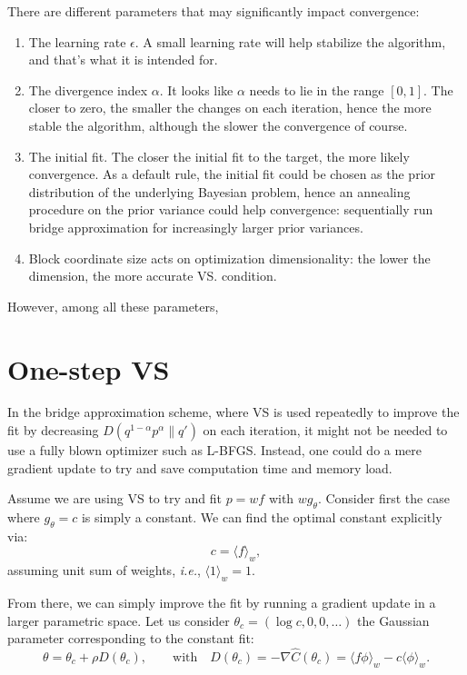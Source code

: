 \documentclass{article}
\begin{document}
There are different parameters that may significantly impact convergence:
\begin{enumerate}
\item The learning rate $\epsilon$. A small learning rate will help stabilize the algorithm, and that's what it is intended for. 
\item The divergence index $\alpha$. It looks like $\alpha$ needs to lie in the range $[0,1]$. The closer to zero, the smaller the changes on each iteration, hence the more stable the algorithm, although the slower the convergence of course.
\item The initial fit. The closer the initial fit to the target, the more likely convergence. As a default rule, the initial fit could be chosen as the prior distribution of the underlying Bayesian problem, hence an annealing procedure on the prior variance could help convergence: sequentially run bridge approximation for increasingly larger prior variances.
\item Block coordinate size acts on optimization dimensionality: the lower the dimension, the more accurate VS.  condition.
\end{enumerate}

However, among all these parameters, 


\section{One-step VS}

In the bridge approximation scheme, where VS is used repeatedly to improve the fit by decreasing $D(q^{1-\alpha}p^\alpha\|q')$ on each iteration, it might not be needed to use a fully blown optimizer such as L-BFGS. Instead, one could do a mere gradient update to try and save computation time and memory load. 

Assume we are using VS to try and fit $p=wf$ with $w g_\theta$. Consider first the case where $g_\theta = c$ is simply a constant. We can find the optimal constant explicitly via:
$$
c  = \langle f \rangle_w,
$$
assuming unit sum of weights, {\em i.e.}, $\langle 1 \rangle_w=1$.

From there, we can simply improve the fit by running a gradient update in a larger parametric space. Let us consider $\theta_c = (\log c, 0, 0, \ldots)$ the Gaussian parameter corresponding to the constant fit: 
$$
\theta = \theta_c + \rho D(\theta_c),
\qquad \text{with} \quad
D(\theta_c) = - \nabla \hat{C}(\theta_c)
= \langle f\phi \rangle_w - c \langle \phi \rangle_w.
$$
\end{document}
